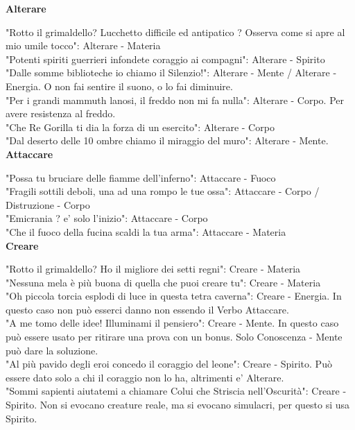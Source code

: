 \documentclass[a4paper,twoside,openany]{book}
\begin{document}
\textbf{Alterare}

"Rotto il grimaldello? Lucchetto difficile ed antipatico ? Osserva come si apre al mio umile tocco": Alterare - Materia\\
"Potenti spiriti guerrieri infondete coraggio ai compagni": Alterare - Spirito\\
"Dalle somme biblioteche io chiamo il Silenzio!": Alterare - Mente / Alterare - Energia. O non fai sentire il suono, o lo fai diminuire.\\
"Per i grandi mammuth lanosi, il freddo non mi fa nulla": Alterare - Corpo. Per avere resistenza al freddo.\\
"Che Re Gorilla ti dia la forza di un esercito": Alterare - Corpo\\
"Dal deserto delle 10 ombre chiamo il miraggio del muro": Alterare - Mente.\\


\textbf{Attaccare}

"Possa tu bruciare delle fiamme dell'inferno": Attaccare - Fuoco\\
"Fragili sottili deboli, una ad una rompo le tue ossa": Attaccare - Corpo / Distruzione - Corpo\\
"Emicrania ? e' solo l'inizio": Attaccare - Corpo\\
"Che il fuoco della fucina scaldi la tua arma": Attaccare - Materia\\

\textbf{Creare}

"Rotto il grimaldello? Ho il migliore dei setti regni": Creare - Materia\\
"Nessuna mela è più buona di quella che puoi creare tu": Creare - Materia\\
"Oh piccola torcia esplodi di luce in questa tetra caverna": Creare - Energia. In questo caso non può esserci danno non essendo il Verbo Attaccare.\\
"A me tomo delle idee! Illuminami il pensiero": Creare - Mente. In questo caso può essere usato per ritirare una prova con un bonus. Solo Conoscenza - Mente può dare la soluzione.\\
"Al più pavido degli eroi concedo il coraggio del leone": Creare - Spirito. Può essere dato solo a chi il coraggio non lo ha, altrimenti e' Alterare.\\
"Sommi sapienti aiutatemi a chiamare Colui che Striscia nell'Oscurità": Creare - Spirito. Non si evocano creature reale, ma si evocano simulacri, per questo si usa Spirito.\\
\end{document}
